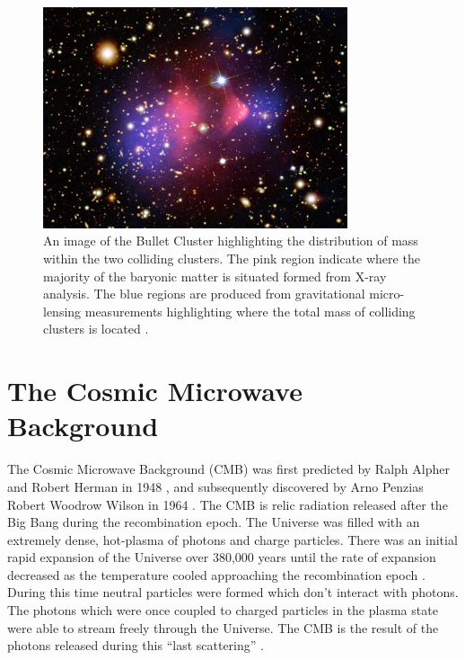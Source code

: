\begin{figure}[ht!]
	\centering
	\includegraphics[width=0.8\textwidth]{figures/DMOverview/Bullet_cluster.jpg}
	\caption[An image of the Bullet Cluster highlighting the distribution of mass within the two colliding clusters.]{An image of the Bullet Cluster highlighting the distribution of mass within the two colliding clusters. The pink region indicate where the majority of the baryonic matter is situated formed from X-ray analysis. The blue regions are produced from gravitational micro-lensing measurements highlighting where the total mass of colliding clusters is located \cite{chandra}.}
	\label{fig:DMOverview/BulletComp}
\end{figure}
\section{The Cosmic Microwave Background}\label{sec:DMOverview/CMB}
The Cosmic Microwave Background (CMB) was first predicted by Ralph Alpher and Robert Herman in 1948 \cite{CMBprediction}, and subsequently discovered by Arno Penzias Robert Woodrow Wilson in 1964 \cite{CMBDisco}. The CMB is relic radiation released after the Big Bang during the recombination epoch. The Universe was filled with an extremely dense, hot-plasma of photons and charge particles. There was an initial rapid expansion of the Universe over 380,000 years until the rate of expansion decreased as the temperature cooled approaching the recombination epoch \cite{DMPrimer}. During this time neutral particles were formed which don't interact with photons. The photons which were once coupled to charged particles in the plasma state were able to stream freely through the Universe. The CMB is the result of the photons released during this ``last scattering'' \cite{Cirelli:2024ssz}.

